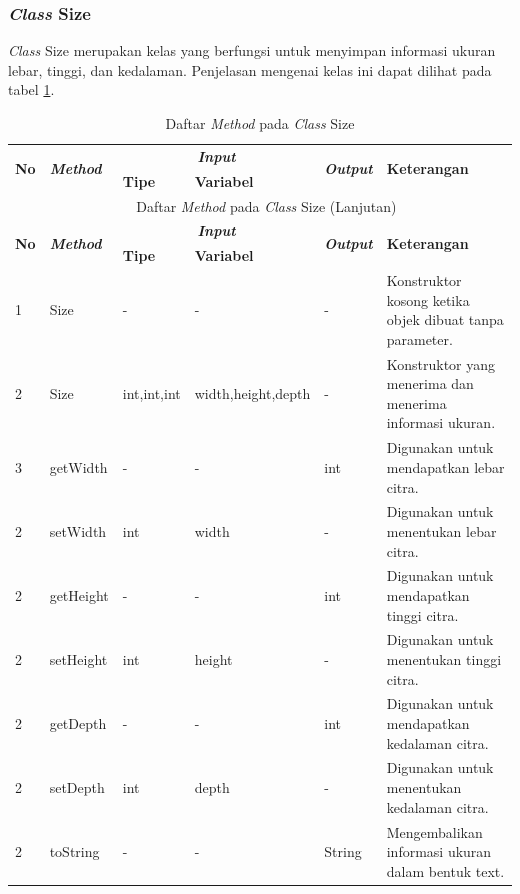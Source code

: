 \subsubsection{\textit{Class} Size}
\noindent \textit{Class} Size merupakan kelas yang berfungsi untuk menyimpan informasi ukuran lebar, tinggi, dan kedalaman. Penjelasan mengenai kelas ini dapat dilihat pada tabel \ref{tbl:classSize}.
\begingroup
\setlength{\LTleft}{-20cm plus -1fill}
\setlength{\LTright}{\LTleft}
\begin{small}
\begin{longtable}{|p{0.4cm}|p{2cm}|p{1.8cm}|p{1.8cm}|p{1.7cm}|p{3.55cm}|}
	\caption{Daftar \textit{Method} pada \textit{Class} Size \label{tbl:classSize}}\\
	\hline
	\multirow{2}{*}{\textbf{No}} & \multirow{2}{*}{\textit{\textbf{Method}}} & \multicolumn{2}{c|}{\textit{\textbf{Input}}} & \multirow{2}{*}{\textit{\textbf{Output}}} & 
	\multirow{2}{*}{\textbf{Keterangan}}\\
	\cline{3-4}
	& & \textbf{Tipe} & \textbf{Variabel} & & \\
	\endfirsthead
	\multicolumn{6}{c}{\textbf{\tablename~\thetable} Daftar \textit{Method} pada \textit{Class} Size (Lanjutan)} \\
	\hline
	\multirow{2}{*}{\textbf{No}} & \multirow{2}{*}{\textit{\textbf{Method}}} & \multicolumn{2}{c|}{\textit{\textbf{Input}}} & \multirow{2}{*}{\textit{\textbf{Output}}} & 
	\multirow{2}{*}{\textbf{Keterangan}}\\
	\cline{3-4}
	& & \textbf{Tipe} & \textbf{Variabel} & & \\
	\endhead
	\hline
	1 & Size & - & - & - & Konstruktor kosong ketika objek dibuat tanpa parameter.\\
	\hline
	2 & Size & int,\newline int,\newline int & width,\newline height,\newline depth & - & Konstruktor yang menerima dan menerima informasi ukuran.\\
	\hline
	3 & getWidth & - & - & int & Digunakan untuk mendapatkan lebar citra.\\
	\hline
	2 & setWidth & int & width & - & Digunakan untuk menentukan lebar citra.\\
	\hline
	2 & getHeight & - & - & int & Digunakan untuk mendapatkan tinggi citra.\\
	\hline
	2 & setHeight & int & height & - & Digunakan untuk menentukan tinggi citra.\\
	\hline
	2 & getDepth & - & - & int & Digunakan untuk mendapatkan kedalaman citra.\\
	\hline
	2 & setDepth & int & depth & - & Digunakan untuk menentukan kedalaman citra.\\
	\hline
	2 & toString & - & - & String & Mengembalikan informasi ukuran dalam bentuk text.\\
	\hline
\end{longtable}
\end{small}
\endgroup

